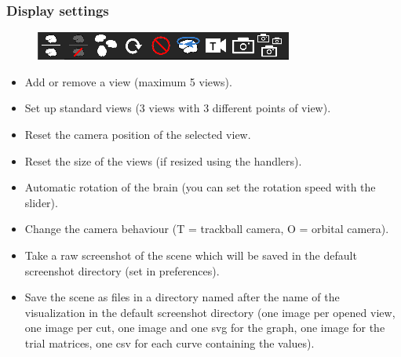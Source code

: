 \documentclass[a4paper]{article}
\begin{document}
\subsubsection{Display settings}
\begin{figure}[H]
\begin{center}
\includegraphics[scale=0.45]{DisplaySettings.png}
\end{center}
\end{figure}
\begin{itemize}
\item Add or remove a view (maximum 5 views).
\item Set up standard views (3 views with 3 different points of view).
\item Reset the camera position of the selected view.
\item Reset the size of the views (if resized using the handlers).
\item Automatic rotation of the brain (you can set the rotation speed with the slider).
\item Change the camera behaviour (T = trackball camera, O = orbital camera).
\item Take a raw screenshot of the scene which will be saved in the default screenshot directory (set in preferences).
\item Save the scene as files in a directory named after the name of the visualization in the default screenshot directory (one image per opened view, one image per cut, one image and one svg for the graph, one image for the trial matrices, one csv for each curve containing the values).
\end{itemize}
\end{document}
